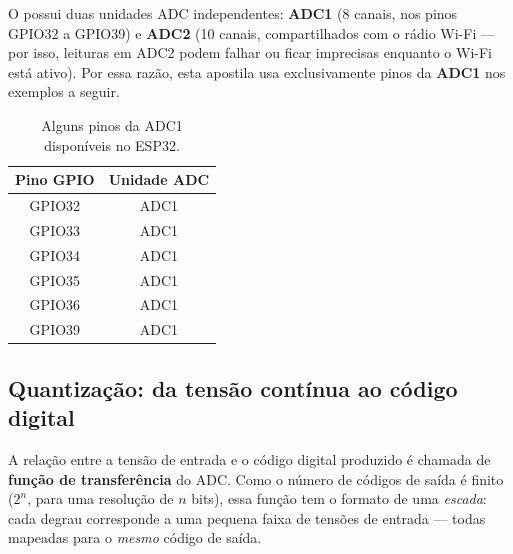 \begin{esp32box}
O \ESP{} possui duas unidades ADC independentes: \textbf{ADC1} (8 canais, nos pinos GPIO32 a GPIO39) e \textbf{ADC2} (10 canais, compartilhados com o rádio Wi-Fi — por isso, leituras em ADC2 podem falhar ou ficar imprecisas enquanto o Wi-Fi está ativo). Por essa razão, esta apostila usa exclusivamente pinos da \textbf{ADC1} nos exemplos a seguir.
\end{esp32box}

\begin{table}[h]
\centering
\begin{tabular}{@{}cc@{}}
\toprule
\textbf{Pino GPIO} & \textbf{Unidade ADC} \\
\midrule
GPIO32 & ADC1 \\
GPIO33 & ADC1 \\
GPIO34 & ADC1 \\
GPIO35 & ADC1 \\
GPIO36 & ADC1 \\
GPIO39 & ADC1 \\
\bottomrule
\end{tabular}
\caption{Alguns pinos da ADC1 disponíveis no ESP32.}
\end{table}

\subsection{Quantização: da tensão contínua ao código digital}

A relação entre a tensão de entrada e o código digital produzido é chamada de \textbf{função de transferência} do ADC. Como o número de códigos de saída é finito ($2^n$, para uma resolução de $n$ bits), essa função tem o formato de uma \emph{escada}: cada degrau corresponde a uma pequena faixa de tensões de entrada — todas mapeadas para o \emph{mesmo} código de saída.

